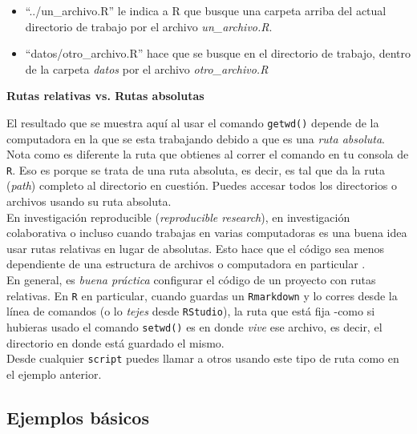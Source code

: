 \documentclass[]{article}
\providecommand{\tightlist}{%
  \setlength{\itemsep}{0pt}\setlength{\parskip}{0pt}}
\begin{document}
\begin{itemize}
\tightlist
\item
  ``../un\_archivo.R'' le indica a R que busque una carpeta arriba del
  actual directorio de trabajo por el archivo \emph{un\_archivo.R}.
\item
  ``datos/otro\_archivo.R'' hace que se busque en el directorio de
  trabajo, dentro de la carpeta \emph{datos} por el archivo
  \emph{otro\_archivo.R}
\end{itemize}

\begin{nota}
\textbf{Rutas relativas vs. Rutas absolutas\\}

El resultado que se muestra aquí al usar el comando \texttt{getwd()} depende de la computadora en la que se esta 
trabajando debido a que es una \textit{ruta absoluta}. Nota como es diferente la ruta 
que obtienes al correr el comando en tu consola de \texttt{R}. Eso es porque se trata 
de una ruta absoluta, es decir, es tal que da la ruta (\textit{path}) completo
al directorio en cuestión. Puedes accesar todos los directorios o archivos usando su ruta absoluta.\\

En investigación reproducible (\textit{reproducible research}), en investigación colaborativa o
incluso cuando trabajas en varias computadoras es una buena idea usar rutas relativas
en lugar de absolutas. Esto hace que el código sea menos dependiente de una estructura
de archivos o computadora en particular \parencite[][p. 67]{gandrud2013}. \\

En general, es \textit{buena práctica} configurar el código de un proyecto con rutas relativas.
En \texttt{R} en particular, cuando guardas un \texttt{Rmarkdown} y lo corres desde la línea de
comandos (o lo \textit{tejes} desde \texttt{RStudio}), la ruta que está fija -como si hubieras usado el comando \texttt{setwd()} es
en donde \textit{vive} ese archivo, es decir, el directorio en donde está guardado el mismo.\\

Desde cualquier \texttt{script} puedes llamar a otros usando este tipo de ruta como en 
el ejemplo anterior.
\end{nota}

\subsection{Ejemplos básicos}\label{ejemplos-basicos}
\end{document}
